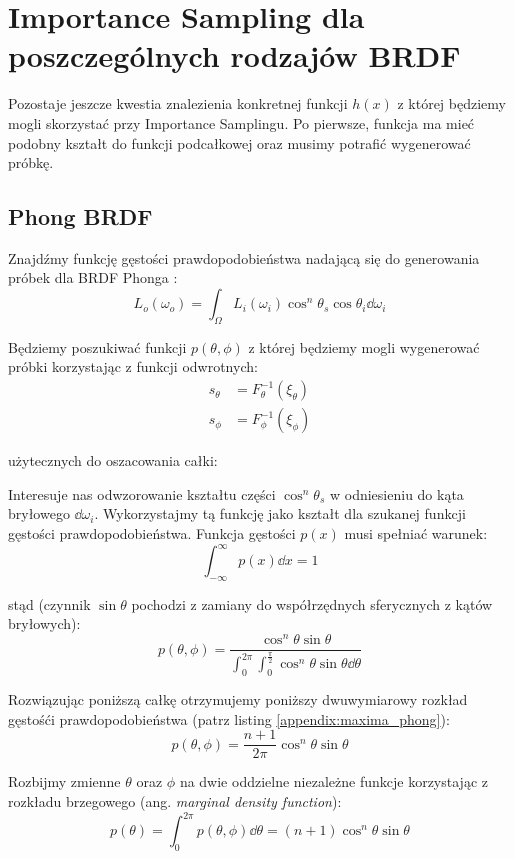 \documentclass[../main.tex]{subfiles}
\begin{document}
\section{Importance Sampling dla poszczególnych rodzajów BRDF}

Pozostaje jeszcze kwestia znalezienia konkretnej funkcji $h(x)$ z której będziemy mogli skorzystać przy Importance Samplingu. Po pierwsze, funkcja ma mieć podobny kształt do funkcji podcałkowej oraz musimy potrafić wygenerować próbkę.

\subsection{Phong BRDF}

Znajdźmy funkcję gęstości prawdopodobieństwa nadającą się do generowania próbek dla BRDF Phonga \cite{NotesImportanceSampling,ImportanceSamplingForProduction}:
\[
  L_o(\omega_o) = \int_{\Omega} {
    L_i(\omega_i) \cos^{n}\theta_s \cos\theta_i \dd \omega_i
  }
\]

Będziemy poszukiwać funkcji $p(\theta, \phi)$ z której będziemy mogli wygenerować próbki korzystając z funkcji
odwrotnych:
\begin{align*}
  s_\theta &= F_{\theta}^{-1}(\xi_\theta) \\
  s_\phi &= F_{\phi}^{-1}(\xi_\phi)
\end{align*}

\noindent użytecznych do oszacowania całki:

Interesuje nas odwzorowanie kształtu części $\cos^{n}\theta_s$ w odniesieniu do kąta bryłowego
$\dd \omega_i$. Wykorzystajmy tą funkcję jako kształt dla szukanej funkcji gęstości
prawdopodobieństwa. Funkcja gęstości $p(x)$ musi spełniać warunek:
\[ 
\int_{-\infty}^{\infty} p(x) \dd x = 1 
\]

\noindent stąd (czynnik $\sin\theta$ pochodzi z zamiany do współrzędnych
sferycznych z kątów bryłowych):
\[
  p(\theta, \phi) = \frac{
    \cos^{n}{\theta} \sin\theta
  }{
    \int_{0}^{2\pi} \int_{0}^{\frac{\pi}{2}} {
      \cos^{n}{\theta} \sin\theta \dd \theta
    }
  }
\]

Rozwiązując poniższą całkę otrzymujemy poniższy dwuwymiarowy rozkład gęstośći
prawdopodobieństwa (patrz listing \ref{appendix:maxima_phong}):
\[
  p(\theta, \phi) =
    \frac{n+1}{2\pi} \cos^{n}\theta \sin\theta
\]

Rozbijmy zmienne $\theta$ oraz $\phi$ na dwie oddzielne niezależne funkcje
korzystając z rozkładu brzegowego (ang. \textit{marginal density function}):
\[
  p(\theta) = \int_{0}^{2\pi} {
    p(\theta, \phi) \dd \theta
  } =
  (n+1) \cos^{n}{\theta} \sin\theta
\]
\end{document}
